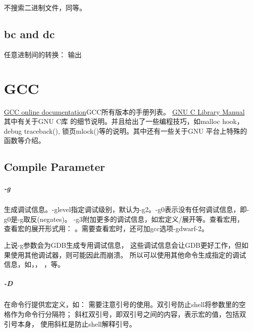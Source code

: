 
不搜索二进制文件，同等。

\section{bc and dc}
任意进制间的转换：
输出



\chapter{GCC}
\noindent\href{http://gcc.gnu.org/onlinedocs/}{GCC online documentation}GCC所有版本的手册列表。
\noindent\href{http://www.gnu.org/software/hello/manual/libc/}{GNU C Library Manual}其中有关于GNU C库
的细节说明。并且给出了一些编程技巧，如malloc hook，debug traceback(), 锁页mlock()等的说明。其中还有一些关于GNU
平台上特殊的函数等介绍。

\section{Compile Parameter}


\paragraph{-g}
生成调试信息。-glevel指定调试级别，默认为-g2。-g0表示没有任何调试信息，即-g0是-g取反(negates)。
-g3附加更多的调试信息，如宏定义/展开等。查看宏用，查看宏的展开形式用：
。需要查看宏时，还可加gcc选项-gdwarf-2。
    
上说-g参数会为GDB生成专用调试信息，
这些调试信息会让GDB更好工作，但如果使用其他调试器，则可能因此而崩溃。
所以可以使用其他命令生成指定的调试信息，如，，
，等。

\paragraph{-D}
在命令行提供宏定义，如：
需要注意引号的使用。双引号防止shell将参数里的空格作为命令行分隔符；
斜杠双引号，即双引号之间的内容，表示宏的值，包括双引号本身，
使用斜杠是防止shell解释引号。

